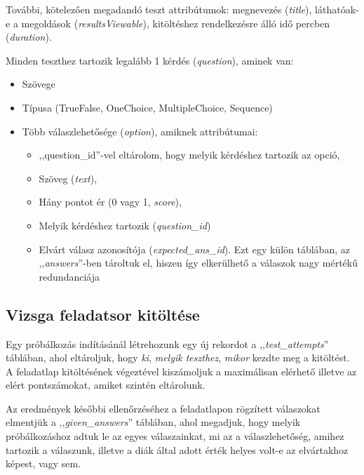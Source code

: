 \documentclass[
]{thesis-ekf}
\theoremstyle{definition}
\theoremstyle{remark}
\begin{document}
                    További, kötelezően megadandó teszt attribútumok: megnevezés (\emph{title}), láthatóak-e a megoldások (\emph{resultsViewable}), kitöltéshez rendelkezésre álló idő percben (\emph{duration}). 

                    Minden teszthez tartozik legalább 1 kérdés (\emph{question}), aminek van:
                    \begin{itemize}
                        \item Szövege
                        \item Típusa (TrueFalse, OneChoice, MultipleChoice, Sequence)
                        \item Több válaszlehetősége (\emph{option}), amiknek attribútumai:
                        \begin{itemize}
                            \item ,,question\_id''-vel eltárolom, hogy melyik kérdéshez tartozik az opció,
                            \item Szöveg (\emph{text}),
                            \item Hány pontot ér (0 vagy 1, \emph{score}),
                            \item Melyik kérdéshez tartozik (\emph{question\_id})
                            \item Elvárt válasz azonosítója (\emph{expected\_ans\_id}). Ezt egy külön táblában, az ,,\emph{answers}''-ben tároltuk el, hiszen így elkerülhető a válaszok nagy mértékű redundanciája
                        \end{itemize}
                    \end{itemize}

                \subsection{Vizsga feladatsor kitöltése}
                    Egy próbálkozás indításánál létrehozunk egy új rekordot a ,,\emph{test\_attempts}'' táblában, ahol eltároljuk, hogy \emph{ki}, \emph{melyik teszthez}, \emph{mikor} kezdte meg a kitöltést. A feladatlap kitöltésének végeztével kiszámoljuk a maximálisan elérhető illetve az elért pontszámokat, amiket szintén eltárolunk. 

                    Az eredmények későbbi ellenőrzéséhez a feladatlapon rögzített válaszokat elmentjük a 
                    ,,\emph{given\_answers}'' táblában, ahol megadjuk, hogy melyik próbálkozáshoz adtuk le az egyes válaszainkat, mi az a válaszlehetőség, amihez tartozik a válaszunk, illetve a diák által adott érték helyes volt-e az elvártakhoz képest, vagy sem.
                    
\end{document}
